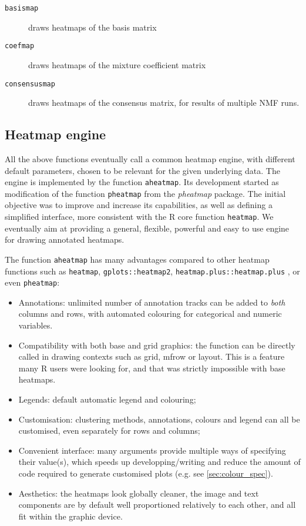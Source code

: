 \documentclass[a4paper]{article}\usepackage[]{graphicx}\usepackage[]{color}
\let\code=\texttt
\newcommand{\pkgname}[1]{\textit{#1}\xspace}
\begin{document}
\begin{description}
\item[\code{basismap}] draws heatmaps of the basis matrix 
\item[\code{coefmap}] draws heatmaps of the mixture coefficient matrix
\item[\code{consensusmap}] draws heatmaps of the consensus matrix, for results 
of multiple NMF runs.
\end{description}

\subsection{Heatmap engine}

All the above functions eventually call a common heatmap engine, with 
different default parameters, chosen to be relevant for the given underlying data.
The engine is implemented by the function \code{aheatmap}. 
Its development started as modification of the function \code{pheatmap} from 
the \pkgname{pheatmap} package. 
The initial objective was to improve and increase its capabilities, as well as 
defining a simplified interface, more consistent with the R core function \code{heatmap}.
We eventually aim at providing a general, flexible, powerful and easy to use engine 
for drawing annotated heatmaps.
  
The function \code{aheatmap} has many advantages compared to other heatmap functions 
such as \code{heatmap}, \code{gplots::heatmap2}, \code{heatmap.plus::heatmap.plus} 
, or even \code{pheatmap}:

\begin{itemize}
\item Annotations: unlimited number of annotation tracks can be added to 
\emph{both} columns and rows, with automated colouring for categorical and 
numeric variables.
\item Compatibility with both base and grid graphics: the function can be 
directly called in drawing contexts such as grid, mfrow or layout.
This is a feature many R users were looking for, and that was strictly 
impossible with base heatmaps.
\item Legends: default automatic legend and colouring;
\item Customisation: clustering methods, annotations, colours and legend can all 
be customised, even separately for rows and columns;
\item Convenient interface: many arguments provide multiple ways of 
specifying their value(s), which speeds up developping/writing and reduce the 
amount of code required to generate customised plots (e.g. see
\cref{sec:colour_spec}).
\item Aesthetics: the heatmaps look globally cleaner, the image and text components 
are by default well proportioned relatively to each other, and all fit within 
the graphic device.
\end{itemize}
\end{document}
